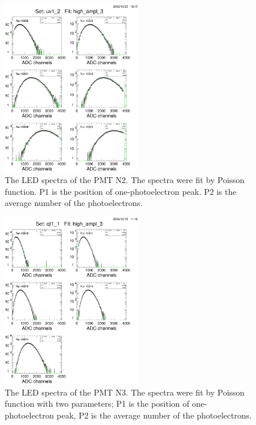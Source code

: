 \documentclass[11pt,titlepage]{article}
\begin{document}

 \begin{figure}
 \hspace{0.5cm}
 \begin{centering}
  \includegraphics[height=7.5cm]{uv_2_fit.eps}
 \vspace{0.5cm}
 \caption{\label{uv_2_fit}
The LED spectra of the PMT N2. The spectra were fit by Poisson function.
P1 is the position of one-photoelectron peak. P2 is the average number of the photoelectrons.}
\end{centering}
 \end{figure}


 \begin{figure}
 \hspace{0.5cm}
 \begin{centering}
  \includegraphics[height=7.5cm]{qt_1_fit.eps}
 \vspace{0.5cm}
 \caption{\label{qt_1_fit}
The LED spectra of the PMT N3. The spectra were fit by Poisson function
with two parameters; 
P1 is the position of one-photoelectron peak, P2 is the average number of the photoelectrons.}
\end{centering}
 \end{figure}
\end{document}
